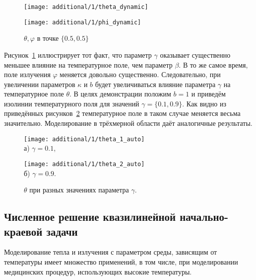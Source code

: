 \begin{figure}[h!t]
    \begin{minipage}[b][][b]{0.49\linewidth}
        \centering
        \texttt{[image: additional/1/theta\_dynamic]}
    \end{minipage}
    \hfill
    \begin{minipage}[b][][b]{0.49\linewidth}
        \centering
        \texttt{[image: additional/1/phi\_dynamic]}
    \end{minipage}
    \caption{$\theta, \varphi$ в точке $\{0.5, 0.5\}$}
    \label{fig:4_1:dep}
\end{figure}

Рисунок~\ref{fig:4_1:dep} иллюстрирует тот факт, что параметр $\gamma$ оказывает существенно меньшее влияние
на температурное поле, чем параметр $\beta$.
В то же самое время, поле излучения $\varphi$ меняется довольно существенно.
Следовательно, при увеличении параметров $\kappa$ и $b$
будет увеличиваться влияние параметра $\gamma$ на температурное поле $\theta$.
В целях демонстрации положим $b = 1$ и приведём изолинии температурного поля для значений
$\gamma = \{0.1, 0.9\}$.
Как видно из приведённых рисунков~\ref{fig:4_1:theta_diff} температурное поле
в таком случае меняется весьма значительно.
Моделирование в трёхмерной области даёт аналогичные результаты.

\begin{figure}[h!t]
    \begin{minipage}[b][][b]{0.49\linewidth}
        \centering
        \texttt{[image: additional/1/theta\_1\_auto]} \\ а) $\gamma = 0.1$,
    \end{minipage}
    \hfill
    \begin{minipage}[b][][b]{0.49\linewidth}
        \centering
        \texttt{[image: additional/1/theta\_2\_auto]} \\ б) $\gamma = 0.9$.
    \end{minipage}
    \caption{$\theta$ при разных значениях параметра $\gamma$.}
    \label{fig:4_1:theta_diff}
\end{figure}

\subsection{Численное решение квазилинейной начально-краевой задачи}
\label{subsec:ch4/sec1/quasilinear}
Моделирование тепла и излучения с параметром среды, зависящим от температуры
имеет множество применений, в том числе, при моделировании медицинских процедур,
использующих высокие температуры.

